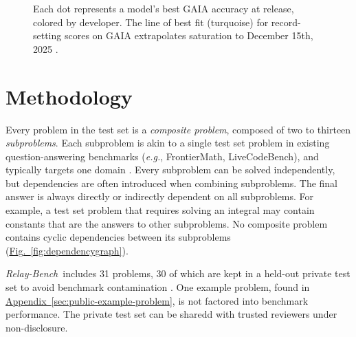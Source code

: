 \documentclass[10pt,letterpaper,twocolumn]{article}
\newcommand{\figref}[1]{\hyperref[#1]{\textcolor{customorange}{Fig.~\ref*{#1}}}}
\newcommand{\appendixref}[1]{\hyperref[#1]{\textcolor{customorange}{Appendix~\ref*{#1}}}}
\newcommand{\relaybench}{\texorpdfstring{{\textit{Relay-Bench}}}{Relay-Bench}}
\begin{document}
\begin{figure}[H]
\caption{Each dot represents a model's best GAIA accuracy at release, colored by developer. The line of best fit (turquoise) for record-setting scores on GAIA extrapolates saturation to December 15th, 2025 \cite{gaia-leaderboard}.}
\label{fig:gaia-scores}
\end{figure}

\section{Methodology}

Every problem in the test set is a \textit{composite problem}, composed of two to thirteen \textit{subproblems}. Each subproblem is akin to a single test set problem in existing question-answering benchmarks (\textit{e.g.}, FrontierMath, LiveCodeBench), and typically targets one domain \cite{frontiermath,livecodebench}. Every subproblem can be solved independently, but dependencies are often introduced when combining subproblems. The final answer is always directly or indirectly dependent on all subproblems. For example, a test set problem that requires solving an integral may contain constants that are the answers to other subproblems. No composite problem contains cyclic dependencies between its subproblems (\figref{fig:dependencygraph}).

\relaybench\ includes 31 problems, 30 of which are kept in a held-out private test set to avoid benchmark contamination \cite{deng2024contamination}. One example problem, found in \appendixref{sec:public-example-problem}, is not factored into benchmark performance. The private test set can be sharedd with trusted reviewers under non-disclosure.\footnotemark
{}
\end{document}
